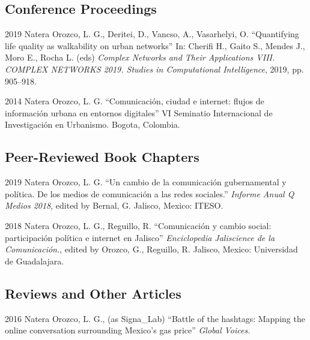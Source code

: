 \documentclass{academiccv}
\begin{document}
\subsection*{Conference Proceedings}
\begin{tablist}
	\item[2019] \tab Natera Orozco, L. G., Deritei, D., Vancso, A., Vasarhelyi, O. \enquote{Quantifying life quality as walkability on urban networks} In: Cherifi H., Gaito S., Mendes J., Moro E., Rocha L. (eds) \textit{Complex Networks and Their Applications VIII. COMPLEX NETWORKS 2019. Studies in Computational Intelligence}, 2019, pp. 905–918.
	\item[2014] \tab Natera Orozco, L. G. \enquote{Comunicación, ciudad e internet: flujos de información urbana en entornos digitales} VI Seminatio Internacional de Investigación en Urbanismo. Bogota, Colombia.
\end{tablist}

\subsection*{Peer-Reviewed Book Chapters}
\begin{tablist}
	\item[2019] \tab Natera Orozco, L. G. \enquote{Un cambio de la comunicación gubernamental y política. De los medios de comunicación a las redes sociales.} \textit{Informe Anual Q Medios 2018}, edited by Bernal, G. Jalisco, Mexico: ITESO.
	\item[2018] \tab Natera Orozco, L. G., Reguillo, R. \enquote{Comunicación y cambio social: participación política e internet en Jalisco} \textit{Enciclopedia Jaliscience de la Comunicación.}, edited by Orozco, G., Reguillo, R. Jalisco, Mexico: Universidad de Guadalajara.
\end{tablist}

\subsection*{Reviews and Other Articles}
\begin{tablist}
	\item[2016] \tab Natera Orozco, L. G., (as Signa\_Lab) \enquote{Battle of the hashtags: Mapping the online conversation surrounding Mexico's gas price} \textit{Global Voices.}
\end{tablist}

\end{document}
